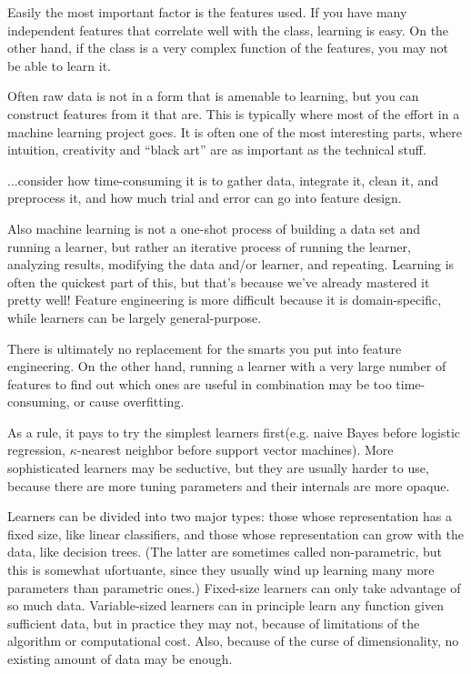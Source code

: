 Easily the most important factor is the features used. If you have many independent features that correlate well with the class, learning is easy. On the other hand, if the class is a very complex function of the features, you may not be able to learn it.\cite{Domingos2012}

Often raw data is not in a form that is amenable to learning, but you can construct features from it that are. This is typically where most of the effort in a machine learning project goes. It is often one of the most interesting parts, where intuition, creativity and “black art” are as important as the technical stuff.\cite{Domingos2012}

...consider how time-consuming it is to gather data, integrate it, clean it, and preprocess it, and how much trial and error can go into feature design.\cite{Domingos2012}

Also machine learning is not a one-shot process of building a data set and running a learner, but rather an iterative process of running the learner, analyzing results, modifying the data and/or learner, and repeating. Learning is often the quickest part of this, but that’s because we’ve already mastered it pretty well! Feature engineering is more difficult because it is domain-specific, while learners can be largely general-purpose.\cite{Domingos2012}

There is ultimately no replacement for the smarts you put into feature engineering. On the other hand, running a learner with a very large number of features to find out which ones are useful in combination may be too time-consuming, or cause overfitting.\cite{Domingos2012}

As a rule, it pays to try the simplest learners first(e.g. naive Bayes before logistic regression, $\kappa$-nearest neighbor before support vector machines). More sophisticated learners may be seductive, but they are usually harder to use, because there are more tuning parameters and their internals are more opaque.\cite{Domingos2012}

Learners can be divided into two major types: those whose representation has a fixed size, like linear classifiers, and those whose representation can grow with the data, like decision trees. (The latter are sometimes called non-parametric, but this is somewhat ufortuante, since they usually wind up learning many more parameters than parametric ones.) Fixed-size learners can only take advantage of so much data. Variable-sized learners can in principle learn any function given sufficient data, but in practice they may not, because of limitations of the algorithm or computational cost. Also, because of the curse of dimensionality, no existing amount of data may be enough.\cite{Domingos2012}

